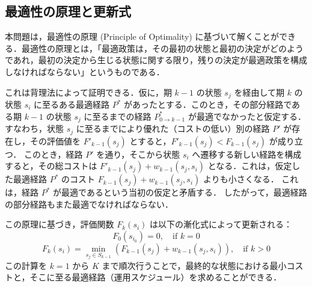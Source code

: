 \documentclass{jarticle}
\begin{document}
\subsection{最適性の原理と更新式}
本問題は，最適性の原理 (Principle of Optimality) に基づいて解くことができる．最適性の原理とは，「最適政策は，その最初の状態と最初の決定がどのようであれ，最初の決定から生じる状態に関する限り，残りの決定が最適政策を構成しなければならない」というものである．

これは背理法によって証明できる．仮に，期 $k-1$ の状態 $s_j$ を経由して期 $k$ の状態 $s_i$ に至るある最適経路 $P^*$ があったとする．このとき，その部分経路である期 $k-1$ の状態 $s_j$ に至るまでの経路 $P^*_{0 \to k-1}$ が最適でなかったと仮定する．
すなわち，状態 $s_j$ に至るまでにより優れた（コストの低い）別の経路 $P'$ が存在し，その評価値を $F'_{k-1}(s_j)$ とすると，$F'_{k-1}(s_j) < F_{k-1}(s_j)$ が成り立つ．
このとき，経路 $P'$ を通り，そこから状態 $s_i$ へ遷移する新しい経路を構成すると，その総コストは $F'_{k-1}(s_j) + w_{k-1}(s_j, s_i)$ となる．これは，仮定した最適経路 $P^*$ のコスト $F_{k-1}(s_j) + w_{k-1}(s_j, s_i)$ よりも小さくなる．
これは，経路 $P^*$ が最適であるという当初の仮定と矛盾する．
したがって，最適経路の部分経路もまた最適でなければならない．

この原理に基づき，評価関数 $F_k(s_i)$ は以下の漸化式によって更新される：
\[
F_{0}(s_{i_{0}}) = 0 , \quad \text{if } k = 0
\]
\[
F_{k}(s_{i}) = \min_{s_{j} \in S_{k-1}} ( F_{k-1}(s_{j}) + w_{k-1}(s_{j},s_{i}) )  , \quad \text{if } k > 0
 \label{eq:minimize}
\]
この計算を $k=1$ から $K$ まで順次行うことで，最終的な状態における最小コストと，そこに至る最適経路（運用スケジュール）を求めることができる．
\end{document}

